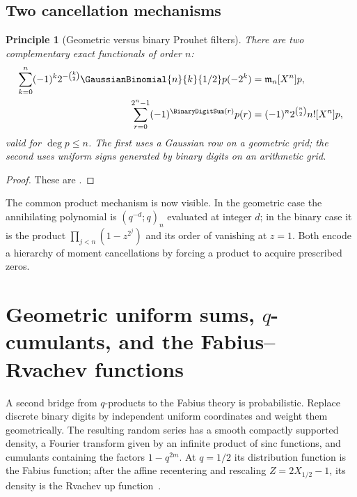 \documentclass[11pt,a4paper,oneside,openany]{book}
\newtheorem{principle}[principle]{Principle}
\theoremstyle{definition}
\theoremstyle{remark}
\begin{document}
\section{Two cancellation mechanisms}

\begin{principle}[Geometric versus binary Prouhet filters]\label{prin:two-prouhet-filters}
There are two complementary exact functionals of order $n$:
\begin{align*}
 \sum_{k=0}^{n}(-1)^k2^{-\binom k2}\GaussianBinomial{n}{k}{1/2}p(-2^k)
 &=\mathfrak m_n[X^n]p,\\
 \sum_{r=0}^{2^n-1}(-1)^{\BinaryDigitSum(r)}p(r)
 &=(-1)^n2^{\binom n2}n![X^n]p,
\end{align*}
valid for $\deg p\le n$.  The first uses a Gaussian row on a geometric grid; the second uses uniform signs generated by binary digits on an arithmetic grid.
\end{principle}

\begin{proof}
These are .
\end{proof}

The common product mechanism is now visible.  In the geometric case the annihilating polynomial is $(q^{-d};q)_n$ evaluated at integer $d$; in the binary case it is the product $\prod_{j<n}(1-z^{2^j})$ and its order of vanishing at $z=1$.  Both encode a hierarchy of moment cancellations by forcing a product to acquire prescribed zeros.

\chapter{Geometric uniform sums, \texorpdfstring{$q$}{q}-cumulants, and the Fabius--Rvachev functions}\label{chap:geometric-uniform-fabius}

A second bridge from $q$-products to the Fabius theory is probabilistic.  Replace discrete binary digits by independent uniform coordinates and weight them geometrically.  The resulting random series has a smooth compactly supported density, a Fourier transform given by an infinite product of sinc functions, and cumulants containing the factors $1-q^{2m}$.  At $q=1/2$ its distribution function is the Fabius function; after the affine recentering and rescaling $Z=2X_{1/2}-1$, its density is the Rvachev up function~\cite{Fabius1966,Rvachev1990,AriasDeReyna1982,ReshetnikovProveIt2026}.
\end{document}
